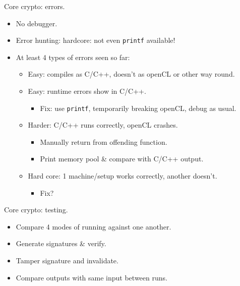 \begin{frame}[fragile]
Core crypto: errors.
\begin{itemize}
\item No debugger.
\item Error hunting: hardcore: not even \verb|printf| available!
\item At least 4 types of errors seen so far:
\begin{itemize}
\item Easy: compiles as C/C++, doesn't as openCL or other way round.
\item Easy: runtime errors show in C/C++. 
\begin{itemize}
\item Fix: use \verb|printf|, temporarily breaking openCL, debug as usual.
\end{itemize}
\item Harder: C/C++ runs correctly, openCL crashes.
\begin{itemize}
\item Manually return from offending function.
\item Print memory pool \& compare with C/C++ output. 
\end{itemize}
\item Hard core: 1 machine/setup works correctly, another doesn't.
\begin{itemize}
\item Fix?
\end{itemize}
\end{itemize}
\end{itemize}
Core crypto: testing.
\begin{itemize}
\item Compare 4 modes of running against one another.
\item Generate signatures \& verify. 
\item Tamper signature and invalidate.
\item Compare outputs with same input between runs.
\end{itemize}


\end{frame}

